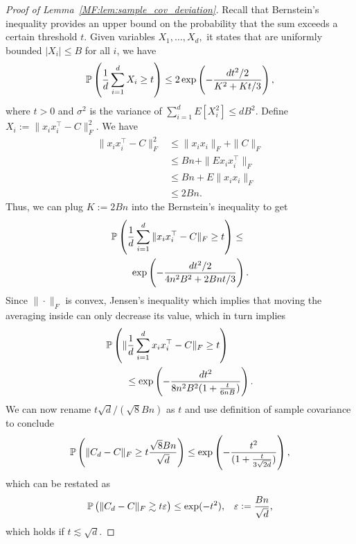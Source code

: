 \begin{proof}[Proof of Lemma~\ref{MF:lem:sample_cov_deviation}]
Recall that Bernstein's inequality provides an upper bound on the probability that the sum exceeds a certain threshold $t$. Given \iid variables $X_1,\dots,X_d,$ it states that are uniformly bounded $|X_i|\le B$ for all $i$, we have
\begin{align}
\P\left(\frac{1}{d} \sum_{i=1}^{d} X_i\geq t\right) \leq 2 \exp\left(-\frac{dt^2/2}{K^2 + Kt/3}\right),
\end{align}
where $t > 0$ and $\sigma^2$ is the variance of $\sum_{i=1}^{d} E[ X_i^2] \le d B^2 $. 
Define $X_i:=\|x_i x_i^\top - C\|_F^2.$ We have
\begin{align}
    \|x_i x_i^\top - C\|_F^2 &\le \|x_i x_i\|_F + \|C\|_F\\
    &\le B n + \|E x_i x_i^\top \|_F\\
    &\le B n + E \|x_ix_i\|_F\\
    &\le 2 B n.
\end{align}
Thus, we can plug $K:= 2 B n $ into the Bernstein's inequality to get 
\begin{align}
&\P\left(\frac1d\sum_{i=1}^{d} \|x_i x_i^\top - C\|_F \geq t\right) \leq\\
&\qquad \exp\left(-\frac{dt^2/2}{ 4 n^2\distort^2 + 2\distort n t/3}\right).
\end{align}
Since $\|\cdot\|_F $ is convex, Jensen's inequality which implies that moving the averaging inside can only decrease its value, which in turn implies 
\begin{align}
&\P\left(\|\frac1d\sum_{i=1}^{d}  x_i x_i^\top - C\|_F \geq t\right)\\
&\qquad \leq \exp\left(-\frac{d t^2}{ 8 n^2\distort^2 (1 + \frac{t}{6n\distort})}\right).
\end{align}
We can now rename $t \sqrt{d}/(\sqrt{8} B n)$ as $t$ and use definition of sample covariance to conclude 
\begin{align}
    \P\left(\|C_d - C\|_F \ge t \frac{\sqrt{8} B n}{\sqrt{d}}\right)\le \exp\left(- \frac{t^2}{(1+\frac{t}{3\sqrt{2 d}})}\right),
\end{align}
which can be restated as
\begin{align}
 \P\left(\|C_d - C\|_F \gtrsim t \eps\right)\le \exp(- t^2), &&  \eps:=\frac{ B n}{\sqrt{d}},
\end{align}
which holds if $t \lesssim \sqrt{d}.$
\end{proof}


